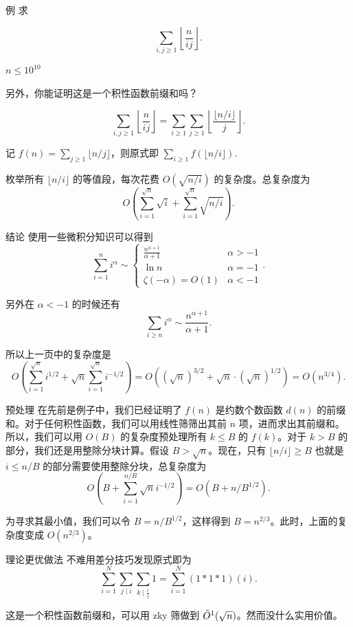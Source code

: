 \begin{frame}{例}
    求

    $$
    \sum_{i,j\ge 1}\left\lfloor\frac{n}{ij}\right\rfloor.
    $$

    $n\le 10^{10}$

    另外，你能证明这是一个积性函数前缀和吗？
\end{frame}
\begin{frame}
    $$
    \sum_{i,j\ge 1}\left\lfloor\frac{n}{ij}\right\rfloor=\sum_{i\ge 1}\sum_{j\ge 1}\left\lfloor\frac{\lfloor n/i\rfloor}{j}\right\rfloor.
    $$

    记 $f(n)=\sum_{j\ge 1}\lfloor n/j\rfloor$，则原式即 $\sum_{i\ge 1}f(\lfloor n/i\rfloor)$.

    枚举所有 $\lfloor n/i\rfloor$ 的等值段，每次花费 $O(\sqrt{n/i})$ 的复杂度。总复杂度为
    $$
    O\left(\sum_{i=1}^{\sqrt{n}}\sqrt{i}+\sum_{i=1}^{\sqrt{n}}\sqrt{n/i}\right).
    $$
\end{frame}
\begin{frame}{结论}
    使用一些微积分知识可以得到
    $$
    \sum_{i=1}^n i^{\alpha}\sim \begin{cases}\frac{n^{\alpha+1}}{\alpha+1}&\alpha>-1\\\ln n&\alpha=-1\\ \zeta(-\alpha)=O(1)&\alpha<-1\end{cases}.
    $$

    另外在 $\alpha<-1$ 的时候还有
    $$
    \sum_{i\ge n}i^{\alpha}\sim \frac{n^{\alpha+1}}{\alpha+1}.
    $$

    所以上一页中的复杂度是
    $$
    O\left(\sum_{i=1}^{\sqrt{n}}i^{1/2}+\sqrt{n}\sum_{i=1}^{\sqrt{n}}i^{-1/2}\right)=O((\sqrt{n})^{3/2}+\sqrt{n}\cdot(\sqrt{n})^{1/2})=O(n^{3/4}).
    $$
\end{frame}
\begin{frame}{预处理}
    在先前是例子中，我们已经证明了 $f(n)$ 是约数个数函数 $d(n)$ 的前缀和。对于任何积性函数，我们可以用线性筛筛出其前 $n$ 项，进而求出其前缀和。所以，我们可以用 $O(B)$ 的复杂度预处理所有 $k\le B$ 的 $f(k)$。对于 $k>B$ 的部分，我们还是用整除分块计算。假设 $B>\sqrt{n}$。现在，只有 $\lfloor n/i\rfloor \ge B$ 也就是 $i\le n/B$ 的部分需要使用整除分块，总复杂度为
    $$
    O\left(B+\sum_{i=1}^{n/B}\sqrt{n}i^{-1/2}\right)=O\left(B+n/B^{1/2}\right).
    $$

    为寻求其最小值，我们可以令 $B=n/B^{1/2}$，这样得到 $B=n^{2/3}$。此时，上面的复杂度变成 $O(n^{2/3})$。
\end{frame}
\begin{frame}{理论更优做法}
    不难用差分技巧发现原式即为
    $$
    \sum_{i=1}^N\sum_{j\mid i}\sum_{k\mid \frac{i}{j}}1=\sum_{i=1}^N (1\ast 1\ast 1)(i).
    $$

    这是一个积性函数前缀和，可以用 zky 筛做到 $\tilde O\footnotemark(\sqrt{n})$。然而没什么实用价值。
\end{frame}


